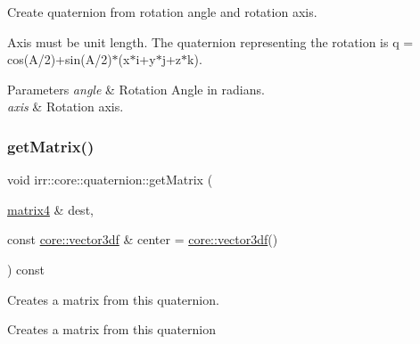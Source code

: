 Create quaternion from rotation angle and rotation axis. 

Axis must be unit length. The quaternion representing the rotation is q = cos(A/2)+sin(A/2)$\ast$(x$\ast$i+y$\ast$j+z$\ast$k). 
\begin{DoxyParams}{Parameters}
{\em angle} & Rotation Angle in radians. \\
\hline
{\em axis} & Rotation axis. \\
\hline
\end{DoxyParams}
\mbox{\label{classirr_1_1core_1_1quaternion_a333ab73cbc2b334ea9f5fe6a5a66058e}} 
\subsubsection{\texorpdfstring{get\+Matrix()}{getMatrix()}}
{\footnotesize\ttfamily void irr\+::core\+::quaternion\+::get\+Matrix (\begin{DoxyParamCaption}\item[{\hyperlink{namespaceirr_1_1core_a4c9d4e29899535971052810954a14431}{matrix4} \&}]{dest,  }\item[{const \hyperlink{namespaceirr_1_1core_ae6e2b2a6c552833ebbd5b7463d03586b}{core\+::vector3df} \&}]{center = {\ttfamily \hyperlink{namespaceirr_1_1core_ae6e2b2a6c552833ebbd5b7463d03586b}{core\+::vector3df}()} }\end{DoxyParamCaption}) const\hspace{0.3cm}{\ttfamily [inline]}}



Creates a matrix from this quaternion. 

Creates a matrix from this quaternion \mbox{\label{classirr_1_1core_1_1quaternion_ab0ed43e2e137b42128a80f71f03dac44}} 
